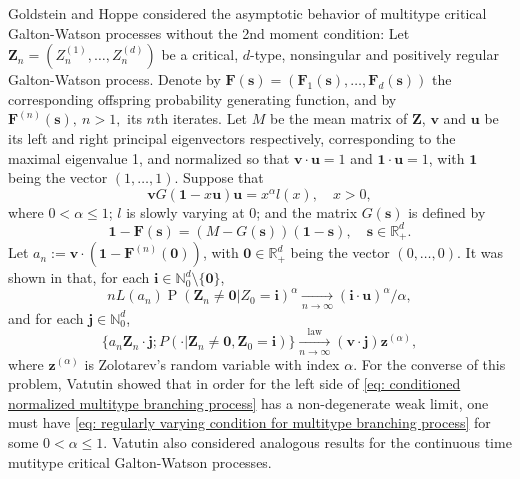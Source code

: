 \documentclass[12pt, a4paper]{amsart}
\theoremstyle{definition}
\numberwithin{equation}{section}
\begin{document}
	Goldstein and Hoppe \cite{GoldsteinHoppe1978Critical} considered the asymptotic behavior of multitype critical Galton-Watson processes without the 2nd moment condition:
	Let $\mathbf Z_n=(Z_n^{(1)}, \dots, Z_n^{(d)})$ be a critical, $d$-type, nonsingular and positively regular Galton-Watson process.
	Denote by $\mathbf F(\mathbf s) = (\mathbf F_1(\mathbf s), \dots, \mathbf F_d(\mathbf s))$ the corresponding offspring probability generating function,
	and  by $\mathbf F^{(n)}(\mathbf s), ~ n>1,$ its $n$th iterates.
	Let $M$ be the mean matrix of $\mathbf Z$, $\mathbf v$ and $\mathbf u$ be its left and right principal  eigenvectors respectively, corresponding to the maximal eigenvalue 1, and normalized so that $\mathbf v \cdot \mathbf u = 1$ and $\mathbf 1 \cdot \mathbf u = 1$, with $\mathbf 1$ being the vector $(1,\dots, 1)$.
	Suppose that
\[\label{eq: regularly varying condition for multitype branching process}
	\mathbf v G(\mathbf 1-x\mathbf u) \mathbf u
	= x^\alpha l(x),
	\quad x > 0,
\]
	where $0 < \alpha \leq 1$; $l$ is slowly varying at $0$; and 
	the matrix $G(\mathbf s)$ is defined by
\[
	\mathbf 1 - \mathbf F(\mathbf s)
	= (M - G(\mathbf s))(\mathbf 1 - \mathbf s),
	\quad \mathbf s \in \mathbb R_+^d.
\]
    Let 
    $a_n := \mathbf v \cdot (\mathbf 1 - \mathbf F^{(n)}(\mathbf 0))$,
    with $\mathbf 0 \in \mathbb R_+^d$ being the vector $(0,\dots, 0)$.
It was shown in \cite{GoldsteinHoppe1978Critical} that,
 for each $\mathbf i \in \mathbb N_0^d \setminus \{\mathbf 0\}$,
\[ \label{eq: limit behavior of the exitinction probability without finite variance of multitype branching processes}
	n L(a_n) \operatorname{P}(\mathbf Z_n \neq \mathbf 0| Z_0 = \mathbf i)^\alpha
	\xrightarrow[n\to \infty]{} (\mathbf i \cdot \mathbf u)^\alpha / \alpha,
\]
	and for each $\mathbf j \in \mathbb N_0^d$,
\[\label{eq: conditioned normalized multitype branching process}
	\{ a_n \mathbf Z_n \cdot \mathbf j ; P(\cdot | \mathbf Z_n \neq \mathbf 0, \mathbf Z_0 = \mathbf i)\}
	\xrightarrow[n\to \infty]{\operatorname{law}} (\mathbf v\cdot \mathbf j) \mathbf z^{(\alpha)},
\]
    where $\mathbf z^{(\alpha)}$ is Zolotarev's random variable with index $\alpha$. 
	For the converse of this problem, Vatutin \cite{Vatutin1977Limit} showed that in order for the left side of \eqref{eq: conditioned normalized multitype branching process} has a non-degenerate weak limit, one must have \eqref{eq: regularly varying condition for multitype branching process} for some $0 < \alpha \leq 1$.
	Vatutin \cite{Vatutin1977Limit} also considered analogous results for the continuous time mutitype critical Galton-Watson processes.
	
\end{document}
